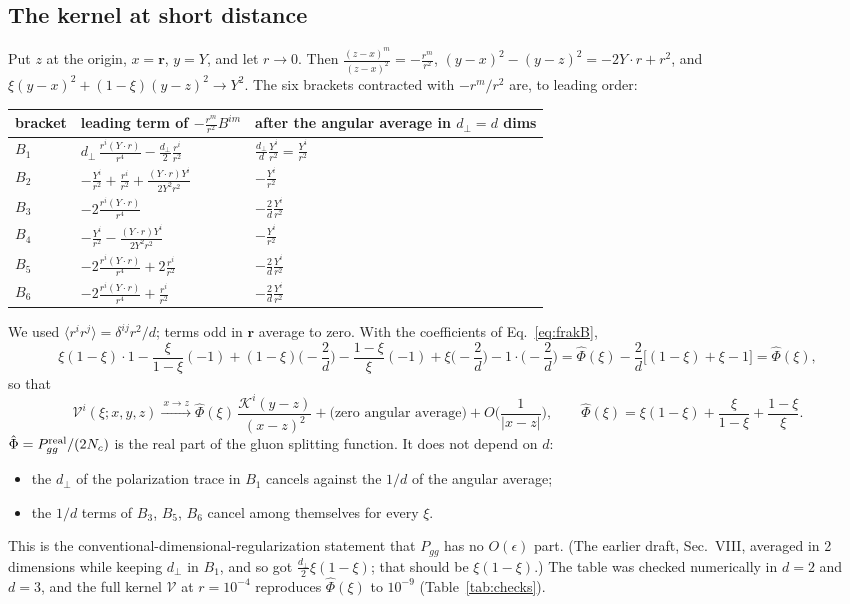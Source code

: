 \documentclass[10pt]{article}
\numberwithin{equation}{section}
\newcommand{\KK}{\mathcal K}
\newcommand{\Ph}{\hat\Phi}
\newcommand{\VV}{\mathcal V}
\newcommand{\ve}{\epsilon}
\begin{document}
\subsection{The kernel at short distance}\label{sec:smallr}
Put $z$ at the origin, $x=\mathbf r$, $y=Y$, and let $r\to0$. Then $\frac{(z-x)^m}{(z-x)^2}=-\frac{r^m}{r^2}$, $(y-x)^2-(y-z)^2=-2Y\cdot r+r^2$, and $\xi(y-x)^2+(1-\xi)(y-z)^2\to Y^2$. The six brackets contracted with $-r^m/r^2$ are, to leading order:
\begin{center}\small
\begin{tabular}{@{}l l l@{}}
bracket & leading term of $-\frac{r^m}{r^2}B^{im}$ & after the angular average in $d_\perp=d$ dims\\ \hline
$B_1$ & $d_\perp\,\frac{r^i(Y\cdot r)}{r^4}-\frac{d_\perp}{2}\frac{r^i}{r^2}$ & $\frac{d_\perp}{d}\frac{Y^i}{r^2}=\frac{Y^i}{r^2}$\\
$B_2$ & $-\frac{Y^i}{r^2}+\frac{r^i}{r^2}+\frac{(Y\cdot r)Y^i}{2Y^2r^2}$ & $-\frac{Y^i}{r^2}$\\
$B_3$ & $-2\frac{r^i(Y\cdot r)}{r^4}$ & $-\frac2d\frac{Y^i}{r^2}$\\
$B_4$ & $-\frac{Y^i}{r^2}-\frac{(Y\cdot r)Y^i}{2Y^2r^2}$ & $-\frac{Y^i}{r^2}$\\
$B_5$ & $-2\frac{r^i(Y\cdot r)}{r^4}+2\frac{r^i}{r^2}$ & $-\frac2d\frac{Y^i}{r^2}$\\
$B_6$ & $-2\frac{r^i(Y\cdot r)}{r^4}+\frac{r^i}{r^2}$ & $-\frac2d\frac{Y^i}{r^2}$\\
\end{tabular}
\end{center}
We used $\langle r^ir^j\rangle=\delta^{ij}r^2/d$; terms odd in $\mathbf r$ average to zero. With the coefficients of Eq.~\eqref{eq:frakB},
\begin{equation}
\xi(1-\xi)\cdot1-\frac{\xi}{1-\xi}(-1)+(1-\xi)\Big(-\frac2d\Big)-\frac{1-\xi}{\xi}(-1)+\xi\Big(-\frac2d\Big)-1\cdot\Big(-\frac2d\Big)
=\Ph(\xi)-\frac2d\big[(1-\xi)+\xi-1\big]=\Ph(\xi),
\end{equation}
so that
\begin{equation}
\boxed{\;\VV^i(\xi;x,y,z)\xrightarrow{\ x\to z\ }\Ph(\xi)\,\frac{\KK^i(y-z)}{(x-z)^2}+\big(\text{zero angular average}\big)+O\Big(\frac{1}{|x-z|}\Big),\qquad \Ph(\xi)=\xi(1-\xi)+\frac{\xi}{1-\xi}+\frac{1-\xi}{\xi}.\;}
\label{eq:VUV}
\end{equation}
$\Ph=P^{\rm real}_{gg}/(2N_c)$ is the real part of the gluon splitting function. It does not depend on $d$:
\begin{itemize}
\item the $d_\perp$ of the polarization trace in $B_1$ cancels against the $1/d$ of the angular average;
\item the $1/d$ terms of $B_3$, $B_5$, $B_6$ cancel among themselves for every $\xi$.
\end{itemize}
This is the conventional-dimensional-regularization statement that $P_{gg}$ has no $O(\ve)$ part. (The earlier draft, Sec.~VIII, averaged in 2 dimensions while keeping $d_\perp$ in $B_1$, and so got $\frac{d_\perp}2\xi(1-\xi)$; that should be $\xi(1-\xi)$.) The table was checked numerically in $d=2$ and $d=3$, and the full kernel $\VV$ at $r=10^{-4}$ reproduces $\Ph(\xi)$ to $10^{-9}$ (Table~\ref{tab:checks}).
\end{document}
